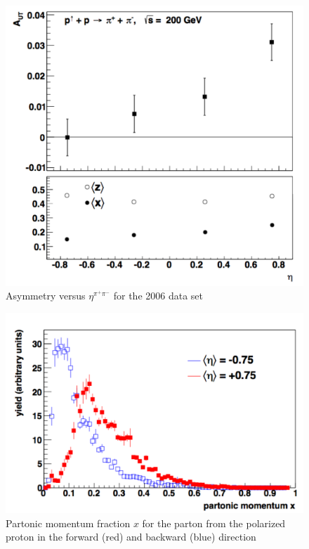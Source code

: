 \documentclass[abstract = on,listof=totoc, bibliography=totoc]{scrreprt}
\newcommand{\etapair}{\eta^{\pi^+\pi^-}}
\newcommand{\pip}{\pi^+}
\newcommand{\pim}{\pi^-}
\newcommand{\pair}{$\pip\pim$ }
\begin{document}
 \begin{figure}
\begin{center}
\includegraphics[width = 1\textwidth]{ansEta_new}
\caption[$A_{UT}$ vs $\etapair$ in 2006 data set]{Asymmetry versus $\etapair$ for the 2006 data set}
\label{fig:ansEta}
\end{center}
\end{figure}

 \begin{figure}
\begin{center}
\includegraphics[width = 1\textwidth]{2006SimX}
\caption[Partonic momentum fraction in 2006 simulation forward and backward \pair pair]{Partonic momentum fraction $x$ for the parton from the polarized proton in the forward (red) and backward (blue) direction}
\label{fig:2006SimX}
\end{center}
\end{figure}
\end{document}
